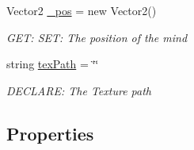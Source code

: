 \begin{DoxyCompactItemize}
Vector2 \hyperlink{a00318_a5804486ad9da9f6220f390e94eb08ab7}{\+\_\+pos} = new Vector2()
\begin{DoxyCompactList}\small\item\em G\+ET\+: S\+ET\+: The position of the mind \end{DoxyCompactList}\item 
string \hyperlink{a00318_a0a20643f397ebed81d1b09965e0b6e3c}{tex\+Path} = \char`\"{}\char`\"{}
\begin{DoxyCompactList}\small\item\em D\+E\+C\+L\+A\+RE\+: The Texture path \end{DoxyCompactList}\end{DoxyCompactItemize}
\subsection*{Properties}
